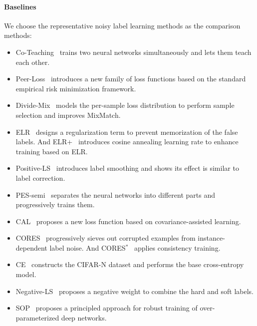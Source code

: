 \documentclass[letterpaper]{article} %
\begin{document}
\paragraph{Baselines}
We choose the representative noisy label learning methods as the comparison methods:
\begin{itemize}
    \item Co-Teaching~\cite{DBLP:conf/nips/HanYYNXHTS18} trains two neural networks simultaneously and lets them teach each other.
    \item Peer-Loss~\cite{DBLP:conf/icml/LiuG20} introduces a new family of loss functions based on the standard empirical risk minimization framework.
    \item Divide-Mix~\cite{DBLP:conf/iclr/LiSH20} models the per-sample loss distribution to perform sample selection and improves MixMatch.
    \item ELR~\cite{DBLP:conf/nips/LiuNRF20} designs a regularization term to prevent memorization of the false labels. And ELR+~\cite{DBLP:conf/nips/LiuNRF20} introduces cosine annealing learning rate to enhance training based on ELR.
\item Positive-LS~\cite{DBLP:conf/icml/LukasikBMK20} introduces label smoothing and shows its effect is similar to label correction.
\item PES-semi~\cite{DBLP:conf/nips/BaiYHYLMNL21} separates the neural networks into different parts and progressively trains them.
\item CAL~\cite{DBLP:conf/cvpr/ZhuL021} proposes a new loss function based on covariance-assisted learning.
\item CORES~\cite{DBLP:conf/iclr/ChengZLGSL21} progressively sieves out corrupted examples from instance-dependent label noise. And CORES$^{*}$~\cite{DBLP:conf/iclr/ChengZLGSL21} applies consistency training.
\item  CE~\cite{DBLP:conf/iclr/WeiZ0L0022} constructs the CIFAR-N dataset and performs the base cross-entropy model. 
\item  Negative-LS~\cite{DBLP:conf/icml/WeiLL0SL22} proposes a negative weight to combine the hard and soft labels.
\item SOP~\cite{DBLP:conf/icml/LiuZQY22} proposes a principled approach for robust training of over-parameterized deep networks.
\end{itemize}
\end{document}
